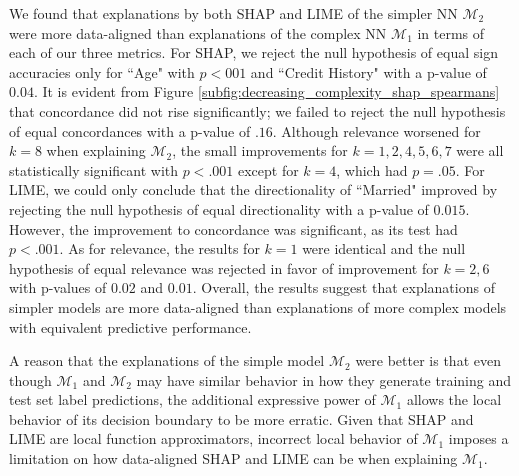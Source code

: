 \documentclass[12pt]{article}  %
\begin{document}
            We found that explanations by both SHAP and LIME of the simpler NN $\mathcal{M}_2$ were more data-aligned than explanations of the complex NN $\mathcal{M}_1$ in terms of each of our three metrics. %
            For SHAP, we reject the null hypothesis of equal sign accuracies only for ``Age" with $p<001$ and ``Credit History" with a p-value of $0.04$. It is evident from Figure \ref{subfig:decreasing_complexity_shap_spearmans} that concordance did not rise significantly; we failed to reject the null hypothesis of equal concordances with a p-value of $.16$. Although relevance worsened for $k=8$ when explaining $\mathcal{M}_2$, the small improvements for $k=1,2,4,5,6,7$ were all statistically significant with $p<.001$ except for $k=4$, which had $p=.05$. %
            For LIME, we could only conclude that the directionality of ``Married" improved by rejecting the null hypothesis of equal directionality with a p-value of $0.015$. However, the improvement to concordance was significant, as its test had $p<.001$. As for relevance, the results for $k=1$ were identical and the null hypothesis of equal relevance was rejected in favor of improvement for $k=2,6$ with p-values of $0.02$ and $0.01$. Overall, the results suggest that explanations of simpler models are more data-aligned than explanations of more complex models with equivalent predictive performance. 
            
            A reason that the explanations of the simple model $\mathcal{M}_2$ were better is that even though $\mathcal{M}_1$ and $\mathcal{M}_2$ may have similar behavior in how they generate training and test set label predictions, the additional expressive power of $\mathcal{M}_1$ allows the local behavior of its decision boundary to be more erratic. Given that SHAP and LIME are local function approximators, incorrect local behavior of $\mathcal{M}_1$ imposes a limitation on how data-aligned SHAP and LIME can be when explaining $\mathcal{M}_1$. 

            
       
\end{document}
